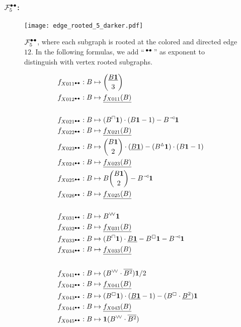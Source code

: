 \documentclass{article}
\theoremstyle{plain}
\begin{document}
\paragraph{$\mathcal{F}_5^{\textcolor{black}{\bullet\!\!-\!\!\bullet}}$:}
\begin{figure}
\centering
\texttt{[image: edge\_rooted\_5\_darker.pdf]}
\caption{\label{F5e} $\mathcal{F}_5^{\textcolor{black}{\bullet\!\!-\!\!\bullet}}$, where each subgraph is rooted at the colored and directed edge $12$. In the following formulas, we add ``$\,^{\textcolor{black}{\bullet\!\!-\!\!\bullet}}\,$'' as exponent to distinguish with vertex rooted subgraphs.}
\end{figure}
\begin{align*}
f_{X011^\dumbbell}: B&\mapsto \binom{\underline{B{\bf 1}}}{3}\\
f_{X012^\dumbbell}: B&\mapsto \underline{f_{X011}(B)}\\
&\\%
f_{X021^\dumbbell}: B&\mapsto (B^\sqcap{\bf 1})\cdot (B{\bf 1}-1)-B^\arro{\bf 1}\\
f_{X022^\dumbbell}: B&\mapsto \underline{f_{X021}(B)}\\
f_{X023^\dumbbell}: B&\mapsto \binom{B{\bf 1}}{2}\cdot (\underline{B{\bf 1}}) - (B^\vartriangle{\bf 1})\cdot (B{\bf 1}-1)\\
f_{X024^\dumbbell}: B&\mapsto \underline{f_{X023}(B)}\\
f_{X025^\dumbbell}: B&\mapsto B\binom{B{\bf 1}}{2}-B^\arro{\bf 1}\\
f_{X026^\dumbbell}: B&\mapsto \underline{f_{X025}(B)}\\
&\\%
f_{X031^\dumbbell}: B&\mapsto B^\pfour{\bf 1}\\
f_{X032^\dumbbell}: B&\mapsto \underline{f_{X031}(B)}\\
f_{X033^\dumbbell}: B&\mapsto (B^\sqcap{\bf 1})\cdot \underline{B{\bf 1}}-B^\boxempty{\bf 1}-B^\arro{\bf 1}\\
f_{X034^\dumbbell}: B&\mapsto \underline{f_{X033}(B)}\\
&\\%
f_{X041^\dumbbell}: B&\mapsto (B^\pfour\cdot\overline{B^2}){\bf 1}/2\\
f_{X042^\dumbbell}: B&\mapsto \underline{f_{X041}(B)}\\
f_{X043^\dumbbell}: B&\mapsto (B^\boxempty{\bf 1})\cdot (\underline{B{\bf 1}}-1)-(B^\boxempty\cdot\underline{B^2}){\bf 1}\\
f_{X044^\dumbbell}: B&\mapsto \underline{f_{X043}(B)}\\
f_{X045^\dumbbell}: B&\mapsto {\bf 1}(B^\pfour\cdot\overline{B^2})\\

\end{align*}
\end{document}
